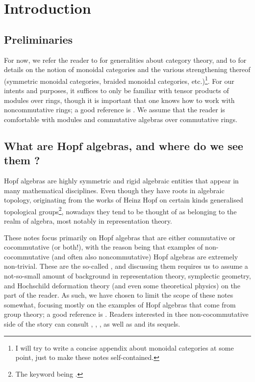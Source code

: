 \section{Introduction}
    \subsection{Preliminaries}
        For now, we refer the reader to \cite{maclane} for generalities about category theory, and to \cite{EGNO_tensor_categories} for details on the notion of monoidal categories and the various strengthening thereof (symmetric monoidal categories, braided monoidal categories, etc.)\footnote{I will try to write a concise appendix about monoidal categories at some point, just to make these notes self-contained.}. For our intents and purposes, it suffices to only be familiar with tensor products of modules over rings, though it is important that one knows how to work with noncommutative rings; a good reference is \cite{lam_first_course_in_noncommutative_rings}. We assume that the reader is comfortable with modules and commutative algebras over commutative rings.

    \subsection{What are Hopf algebras, and where do we see them ?}
        Hopf algebras are highly symmetric and rigid algebraic entities that appear in many mathematical disciplines. Even though they have roots in algebraic topology, originating from the works of Heinz Hopf on certain kinds generalised topological groups\footnote{The keyword being .}, nowadays they tend to be thought of as belonging to the realm of algebra, most notably in representation theory. 
    
        These notes focus primarily on Hopf algebras that are either commutative or cocommutative (or both!), with the reason being that examples of non-cocommutative (and often also noncommutative) Hopf algebras are extremely non-trivial. These are the so-called , and discussing them requires us to assume a not-so-small amount of background in representation theory, symplectic geometry, and Hochschild deformation theory (and even some theoretical physics) on the part of the reader. As such, we have chosen to limit the scope of these notes somewhat, focusing mostly on the examples of Hopf algebras that come from group theory; a good reference is \cite{jantzen_representations_of_algebraic_groups}. Readers interested in thee non-cocommutative side of the story can consult \cite{kassel_quantum_groups}, \cite{etingof_schiffmann_lectures_on_quantum_groups}, \cite{chari_pressley_quantum_groups}, as well as \cite{etingof_kazhdan_quantisation_1} and its sequels.

